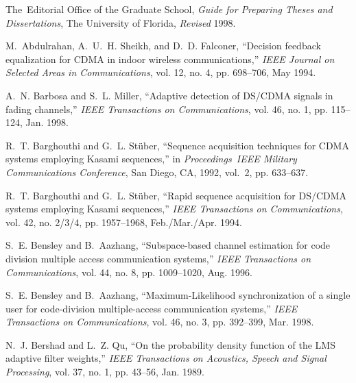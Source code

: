 \begin{thebibliography}{100}
\pagestyle{plain}
The~Editorial Office of the Graduate School,
\newblock \emph{Guide for Preparing Theses and Dissertations},
\newblock The University of Florida, \emph{Revised} 1998.

M.~Abdulrahan, A.~U.~H. Sheikh, and D.~D. Falconer,
\newblock ``Decision feedback equalization for {CDMA} in indoor wireless
  communications,''
\newblock \emph{IEEE Journal on Selected Areas in Communications}, vol. 12, no.
  4, pp. 698--706, May 1994.

A.~N. Barbosa and S.~L. Miller,
\newblock ``Adaptive detection of {DS/CDMA} signals in fading channels,''
\newblock \emph{IEEE Transactions on Communications}, vol. 46, no. 1, pp.
  115--124, Jan. 1998.

R.~T. Barghouthi and G.~L. St{\"u}ber,
\newblock ``Sequence acquisition techniques for {CDMA} systems employing
  {Kasami} sequences,''
\newblock in \emph{Proceedings~IEEE Military Communications Conference}, San
  Diego, CA, 1992, vol.~2, pp. 633--637.

R.~T. Barghouthi and G.~L. St{\"u}ber,
\newblock ``Rapid sequence acquisition for {DS/CDMA} systems employing {Kasami}
  sequences,''
\newblock \emph{IEEE Transactions on Communications}, vol. 42, no. 2/3/4, pp.
  1957--1968, Feb./Mar./Apr. 1994.

S.~E. Bensley and B.~Aazhang,
\newblock ``Subspace-based channel estimation for code division multiple access
  communication systems,''
\newblock \emph{IEEE Transactions on Communications}, vol. 44, no. 8, pp.
  1009--1020, Aug. 1996.

S.~E. Bensley and B.~Aazhang,
\newblock ``{Maximum}-{Likelihood} synchronization of a single user for
  code-division multiple-access communication systems,''
\newblock \emph{IEEE Transactions on Communications}, vol. 46, no. 3, pp.
  392--399, Mar. 1998.

N.~J. Bershad and L.~Z. Qu,
\newblock ``On the probability density function of the {LMS} adaptive filter
  weights,''
\newblock \emph{IEEE Transactions on Acoustics, Speech and Signal Processing},
  vol. 37, no. 1, pp. 43--56, Jan. 1989.


\end{thebibliography}

